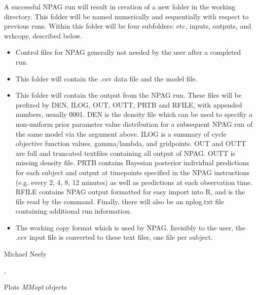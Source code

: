\documentclass[a4paper]{book}
\begin{document}
%
\begin{Value}
A successful NPAG run will result in creation of a new folder in the working
directory.  This folder will be named numerically and sequentially with respect to previous runs.  
Within this folder will be four subfolders: etc, inputs, outputs, and wrkcopy, described below.
\begin{itemize}

\item{}    Control files for NPAG generally not needed by the user after a completed run.
\item{}    This folder will contain the .csv data file and the model file.
\item{}    This folder will contain the output from the NPAG run.  These files will be
prefixed by DEN, ILOG, OUT, OUTT, PRTB and RFILE, with appended numbers, usually 0001.
DEN is the density file which can be used to specifiy a non-uniform prior parameter value
distribution for a subsequent NPAG run of the same model via the  argument
above.  ILOG is a summary of cycle objective function values, gamma/lambda, and gridpoints.
OUT and OUTT are full and truncated textfiles containing all output of NPAG.  OUTT is missing
density file.  PRTB contains Bayesian posterior individual predictions for each subject and
output at timepoints specified in the NPAG instructions (e.g. every 2, 4, 8, 12 minutes) as well
as predictions at each observation time.  RFILE contains NPAG output formatted for easy import
into R, and is the file read by the  command.  Finally, there will also
be an nplog.txt file containing additional run information.
\item{}     The working copy format which is used by NPAG.  Invisibly to the user,
the .csv input file is converted to these text files, one file per subject.  

\end{itemize}

\end{Value}
%
\begin{Author}\relax
Michael Neely
\end{Author}
%
\begin{SeeAlso}\relax
{}, 
\end{SeeAlso}
%
\begin{Description}\relax
Plots \emph{MMopt} objects
\end{Description}
\end{document}
